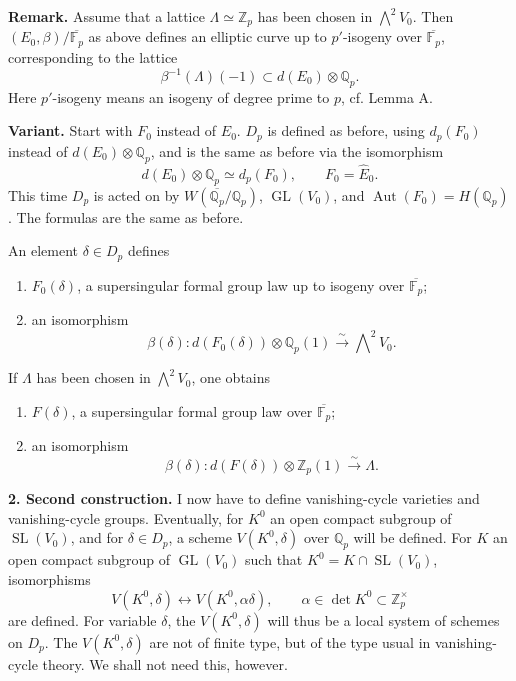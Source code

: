 \documentclass[11pt]{article}
\newcommand{\Fp}{\mathbb{F}_{p}}
\newcommand{\Qp}{\mathbb{Q}_{p}}
\newcommand{\Zp}{\mathbb{Z}_{p}}
\newcommand{\Aut}{\operatorname{Aut}}
\newcommand{\GL}{\operatorname{GL}}
\newcommand{\SL}{\operatorname{SL}}
\newcommand{\wh}{\widehat}
\begin{document}
\textbf{Remark.} Assume that a lattice \(\Lambda\simeq\Zp\) has been chosen in \(\bigwedge^2V_0\). Then \((E_0,\beta)/\overline{\Fp}\) as above defines an elliptic curve up to \(p'\)-isogeny over \(\overline{\Fp}\), corresponding to the lattice
\[
\beta^{-1}(\Lambda)(-1)\subset d(E_0)\otimes\Qp .
\]
Here \(p'\)-isogeny means an isogeny of degree prime to \(p\), cf. Lemma A.

\textbf{Variant.} Start with \(F_0\) instead of \(E_0\). \(D_p\) is defined as before, using \(d_p(F_0)\) instead of \(d(E_0)\otimes\Qp\), and is the same as before via the isomorphism
\[
d(E_0)\otimes\Qp\simeq d_p(F_0),\qquad F_0=\wh E_0 .
\]
This time \(D_p\) is acted on by \(W(\overline{\Qp}/\Qp)\), \(\GL(V_0)\), and \(\Aut(F_0)=H(\Qp)\). The formulas are the same as before.

An element \(\delta\in D_p\) defines
\begin{enumerate}[label=(\alph*)]
\item \(F_0(\delta)\), a supersingular formal group law up to isogeny over \(\overline{\Fp}\);
\item an isomorphism
\[
\beta(\delta):d(F_0(\delta))\otimes\Qp(1)\xrightarrow{\sim}\bigwedge\nolimits^2V_0 .
\]
\end{enumerate}
If \(\Lambda\) has been chosen in \(\bigwedge^2V_0\), one obtains
\begin{enumerate}[label=(\alph*)]
\item \(F(\delta)\), a supersingular formal group law over \(\overline{\Fp}\);
\item an isomorphism
\[
\beta(\delta):d(F(\delta))\otimes\Zp(1)\xrightarrow{\sim}\Lambda .
\]
\end{enumerate}

\textbf{2. Second construction.} I now have to define vanishing-cycle varieties and vanishing-cycle groups. Eventually, for \(K^0\) an open compact subgroup of \(\SL(V_0)\), and for \(\delta\in D_p\), a scheme \(V(K^0,\delta)\) over \(\Qp\) will be defined. For \(K\) an open compact subgroup of \(\GL(V_0)\) such that \(K^0=K\cap\SL(V_0)\), isomorphisms
\[
V(K^0,\delta)\leftrightarrow V(K^0,\alpha\delta),
\qquad \alpha\in\det K^0\subset\Zp^\times
\]
are defined. For variable \(\delta\), the \(V(K^0,\delta)\) will thus be a local system of schemes on \(D_p\). The \(V(K^0,\delta)\) are not of finite type, but of the type usual in vanishing-cycle theory. We shall not need this, however.
\end{document}
